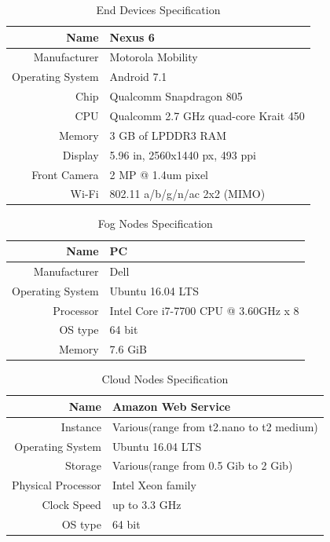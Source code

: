 \begin{table}[h!]
\centering
\begin{tabular}{ |r|l| }
 \hline
Name &    Nexus 6\\
 \hline
Manufacturer &    Motorola Mobility\\
 \hline
Operating System &    Android 7.1\\
 \hline
Chip & Qualcomm Snapdragon 805\\
 \hline
CPU &    Qualcomm 2.7 GHz quad-core Krait 450\\
 \hline
Memory & 3 GB of LPDDR3 RAM \\
 \hline
Display & 5.96 in, 2560x1440 px, 493 ppi \\
 \hline
Front Camera & 2 MP @ 1.4um pixel \\
 \hline
Wi-Fi & 802.11 a/b/g/n/ac 2x2 (MIMO) \\
 \hline
\end{tabular}
\caption{End Devices Specification}
\label{table:end_devices_spec}
\end{table}

\begin{table}[h!]
\centering
\begin{tabular}{ |r|l| }
 \hline
Name &    PC \\
 \hline
Manufacturer &    Dell\\
 \hline
Operating System &    Ubuntu 16.04 LTS\\
 \hline
Processor & Intel Core i7-7700 CPU @ 3.60GHz x 8\\
 \hline
OS type & 64 bit\\
 \hline
Memory & 7.6 GiB\\
 \hline
\end{tabular}
\caption{Fog Nodes Specification}
\label{table:fog_nodes_spec}
\end{table}

\begin{table}[h!]
\centering
\begin{tabular}{ |r|l| }
 \hline
Name &    Amazon Web Service \\
 \hline
Instance & Various(range from t2.nano to t2 medium) \\
 \hline
Operating System &    Ubuntu 16.04 LTS\\
 \hline
Storage & Various(range from 0.5 Gib to 2 Gib)\\
 \hline
Physical Processor & Intel Xeon family\\
 \hline
Clock Speed & up to 3.3 GHz\\
 \hline
OS type & 64 bit\\
 \hline
\end{tabular}
\caption{Cloud Nodes Specification}
\label{table:cloud_nodes_spec}
\end{table}